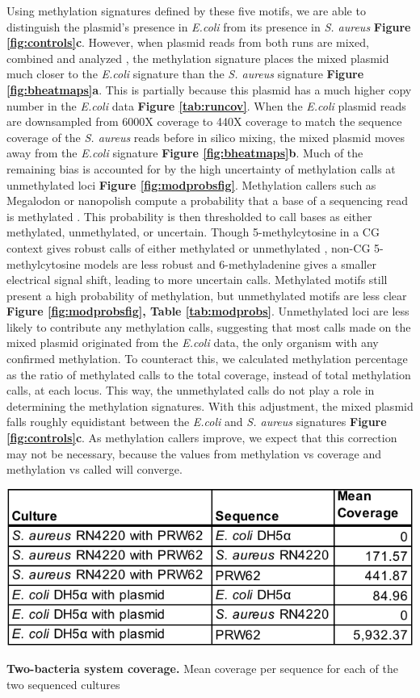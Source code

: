 Using methylation signatures defined by these five motifs, we are able to distinguish the plasmid’s presence in \textit{E.coli} from its presence in \textit{S. aureus} {\bf Figure \ref{fig:controls}c}. However, when plasmid reads from both runs are mixed, combined and analyzed , the methylation signature places the mixed plasmid much closer to the \textit{E.coli} signature than the \textit{S. aureus} signature {\bf Figure \ref{fig:bheatmaps}a}. This is partially because this plasmid has a much higher copy number in the \textit{E.coli} data {\bf Figure \ref{tab:runcov}}. When the \textit{E.coli} plasmid reads are downsampled from 6000X coverage to 440X coverage to match the sequence coverage of the \textit{S. aureus} reads before in silico mixing, the mixed plasmid moves away from the \textit{E.coli} signature {\bf Figure \ref{fig:bheatmaps}b}. Much of the remaining bias is accounted for by the high uncertainty of methylation calls at unmethylated loci {\bf Figure \ref{fig:modprobsfig}}. Methylation callers such as Megalodon or nanopolish compute a probability that a base of a sequencing read is methylated \citep{Simpson2017-wb}. This probability is then thresholded to call bases as either methylated, unmethylated, or uncertain. Though 5-methylcytosine in a CG context gives robust calls of either methylated or unmethylated \citep{Simpson2017-wb}, non-CG 5-methylcytosine models are less robust and 6-methyladenine gives a smaller electrical signal shift, leading to more uncertain calls. Methylated motifs still present a high probability of methylation, but unmethylated motifs are less clear {\bf Figure \ref{fig:modprobsfig}, Table \ref{tab:modprobs}}. Unmethylated loci are less likely to contribute any methylation calls, suggesting that most calls made on the mixed plasmid originated from the \textit{E.coli} data, the only organism with any confirmed methylation. To counteract this, we calculated methylation percentage as the ratio of methylated calls to the total coverage, instead of total methylation calls, at each locus. This way, the unmethylated calls do not play a role in determining the methylation signatures. With this adjustment, the mixed plasmid falls roughly equidistant between the \textit{E.coli} and \textit{S. aureus} signatures {\bf Figure \ref{fig:controls}c}. As methylation callers improve, we expect that this correction may not be necessary, because the values from methylation vs coverage and methylation vs called will converge.

\begin{table}[!hb]
\centering
\includegraphics[width = .5\linewidth,keepaspectratio]{figure/runcov.pdf}
\caption[Two-bacteria system coverage]{{\bf Two-bacteria system coverage.} Mean coverage per sequence for each of the two sequenced cultures }
\label{tab:runcov}
\end{table}



